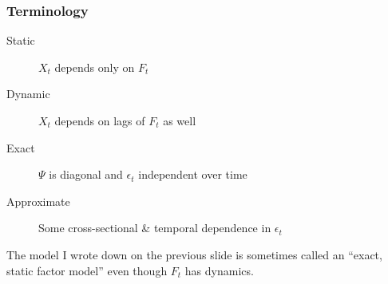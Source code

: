 \begin{frame}[c]\frametitle{Terminology}
 
\begin{description}
	\item[Static] $X_t$ depends only on $F_t$
	\item[Dynamic] $X_t$ depends on lags of $F_t$ as well
	\item[Exact] $\Psi$ is diagonal and $\epsilon_t$ independent over time
	\item[Approximate] Some cross-sectional \& temporal dependence in $\epsilon_t$
\end{description}

\vspace{1em}

\alert{The model I wrote down on the previous slide is sometimes called an ``exact, static factor model'' even though $F_t$ has dynamics.}

\end{frame}

